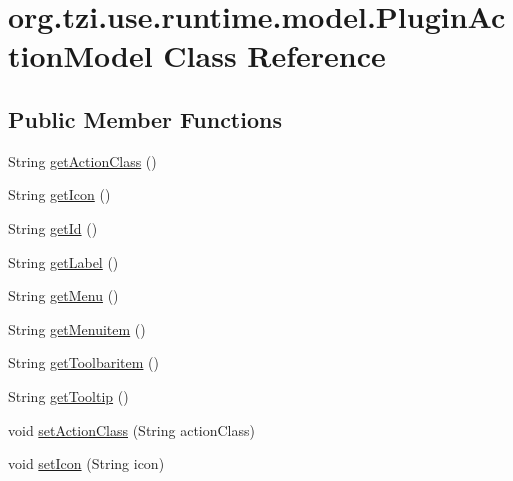 \hypertarget{classorg_1_1tzi_1_1use_1_1runtime_1_1model_1_1_plugin_action_model}{\section{org.\-tzi.\-use.\-runtime.\-model.\-Plugin\-Action\-Model Class Reference}
\label{classorg_1_1tzi_1_1use_1_1runtime_1_1model_1_1_plugin_action_model}
}
\subsection*{Public Member Functions}
\begin{DoxyCompactItemize}
\item 
String \hyperlink{classorg_1_1tzi_1_1use_1_1runtime_1_1model_1_1_plugin_action_model_a1c8edb1c3e53ba61aee297c53cd21f4c}{get\-Action\-Class} ()
\item 
String \hyperlink{classorg_1_1tzi_1_1use_1_1runtime_1_1model_1_1_plugin_action_model_a36ece924e94e9b479b260313e4cbd8c8}{get\-Icon} ()
\item 
String \hyperlink{classorg_1_1tzi_1_1use_1_1runtime_1_1model_1_1_plugin_action_model_a6ed84b98af83e9a74c863dd872105535}{get\-Id} ()
\item 
String \hyperlink{classorg_1_1tzi_1_1use_1_1runtime_1_1model_1_1_plugin_action_model_a5e0f26e450d3a12fbdf1bbb53e5fbd20}{get\-Label} ()
\item 
String \hyperlink{classorg_1_1tzi_1_1use_1_1runtime_1_1model_1_1_plugin_action_model_a68c78e517634665d37da5b468b12f2a2}{get\-Menu} ()
\item 
String \hyperlink{classorg_1_1tzi_1_1use_1_1runtime_1_1model_1_1_plugin_action_model_af1fcaff43e3726400558335f98ec7867}{get\-Menuitem} ()
\item 
String \hyperlink{classorg_1_1tzi_1_1use_1_1runtime_1_1model_1_1_plugin_action_model_afb32cb7f588b1f8c6ac77fb7582201c4}{get\-Toolbaritem} ()
\item 
String \hyperlink{classorg_1_1tzi_1_1use_1_1runtime_1_1model_1_1_plugin_action_model_a2a0caf2fd19ecb0c9a6d8b8bbbbdd5ed}{get\-Tooltip} ()
\item 
void \hyperlink{classorg_1_1tzi_1_1use_1_1runtime_1_1model_1_1_plugin_action_model_a5d4c7f6dffa6c464c9bc739de58121f2}{set\-Action\-Class} (String action\-Class)
\item 
void \hyperlink{classorg_1_1tzi_1_1use_1_1runtime_1_1model_1_1_plugin_action_model_ac819b9b65a6ed2c9d84515cdb37690c3}{set\-Icon} (String icon)

\end{DoxyCompactItemize}

